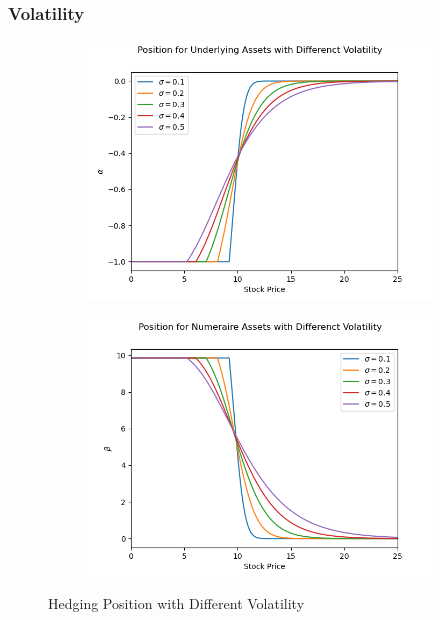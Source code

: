 \documentclass[12pt]{article}
\begin{document}
\subsubsection{Volatility}
\begin{figure}[H]
  \centering
  \begin{subfigure}{.5\textwidth}
    \centering
    \includegraphics[width=\linewidth]{3a-iii-sigma-alpha.png}
  \end{subfigure}%
  \begin{subfigure}{.5\textwidth}
    \centering
    \includegraphics[width=\linewidth]{3a-iii-sigma-beta.png}
  \end{subfigure}%
  \caption[Hedging Position with Different Volatility]{Hedging Position with Different Volatility}
\end{figure}
\end{document}
